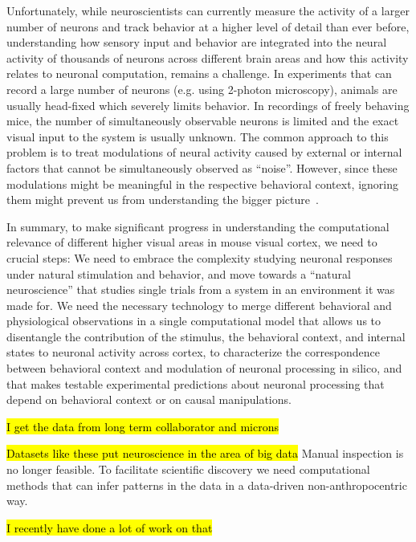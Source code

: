 \documentclass[B2,COG]{ercgrant}
\begin{document}
Unfortunately, while neuroscientists can currently measure the activity of a larger number of neurons and track behavior at a higher level of detail than ever before, understanding how sensory input and behavior are integrated into the neural activity of thousands of neurons across different brain areas and how this activity relates to neuronal computation, remains a challenge.
In experiments that can record a large number of neurons (e.g. using 2-photon microscopy), animals are usually head-fixed which severely limits behavior. 
In recordings of freely behaving mice, the number of simultaneously observable neurons is limited and the exact visual input to the system is usually unknown. 
The common approach to this problem is to treat modulations of neural activity caused by external or internal factors that cannot be simultaneously observed as ``noise''.
However, since these modulations might be meaningful in the respective behavioral context, ignoring them might prevent us from understanding the bigger picture~\parencite{Urai2022-fz}.

In summary, to make significant progress in understanding the computational relevance of different higher visual areas in mouse visual cortex, we need to crucial steps:  We need to embrace the complexity studying neuronal responses under natural stimulation and behavior, and move towards a ``natural neuroscience'' that studies single trials from a system in an environment it was made for.  We need the necessary technology to merge different behavioral and physiological observations in a single computational model that allows us to disentangle the contribution of the stimulus, the behavioral context, and internal states to neuronal activity across cortex, to characterize the correspondence between behavioral context and modulation of neuronal processing in silico, and that makes testable experimental predictions about neuronal processing that depend on behavioral context or on causal manipulations. 

\hl{I get the data from long term collaborator and microns}

\hl{Datasets like these put neuroscience in the area of big data} Manual inspection is no longer feasible. To facilitate scientific discovery we need computational methods that can infer patterns in the data in a data-driven non-anthropocentric way. 

\hl{I recently have done a lot of work on that}
\end{document}
